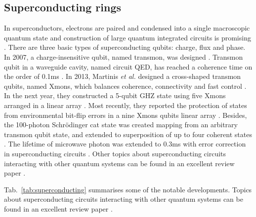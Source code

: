 %
%

\subsection{Superconducting rings} 

In superconductors, electrons are paired and condensed into a single macroscopic quantum state and construction of large quantum integrated circuits is promising \cite{bib:devoret2013superconducting}. There are three basic types of superconducting qubits: charge, flux and phase. In 2007, a charge-insensitive qubit, named transmon, was designed \cite{bib:koch2007charge}. Transmon qubit in a waveguide cavity, named circuit QED, has reached a coherence time on the order of 0.1ms \cite{bib:paik2011observation, bib:rigetti2012superconducting}. In 2013, Martinis \textit{et al.} designed a cross-shaped transmon qubits, named Xmons, which balances coherence, connectivity and fast control \cite{bib:barends2013coherent}. In the next year, they constructed a 5-qubit GHZ state using five Xmons arranged in a linear array \cite{bib:barends2014superconducting}. Most recently, they reported the protection of states from environmental bit-flip errors in a nine Xmons qubits linear array \cite{bib:kelly2015state}. Besides, the 100-photon Schr{\"o}dinger cat state was created mapping from an arbitrary transmon qubit state, and extended to superposition of up to four coherent states \cite{bib:vlastakis2013deterministically}. The lifetime of microwave photon was extended to 0.3ms with error correction in superconducting circuits \cite{bib:ofek2016extending}. Other topics about superconducting circuits interacting with other quantum systems can be found in an excellent review paper \cite{bib:xiang2013hybrid}.

Tab.~\ref{tab:superconducting} summarises some of the notable developments. Topics about superconducting circuits interacting with other quantum systems can be found in an excellent review paper \cite{bib:xiang2013hybrid}.

